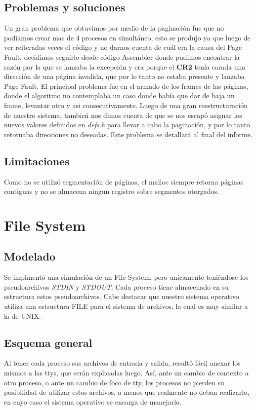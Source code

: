 \documentclass[10pt,a4paper]{article}
\begin{document}
	\subsection{Problemas y soluciones}
		Un gran problema que obtuvimos por medio de la paginaci\'on fue que no podiamos crear mas de 4 procesos en simult\'aneo, esto se produjo ya que luego de ver reiteradas veces el c\'odigo y no darnos cuenta de cu\'al era la causa del Page Fault, decidimos seguirlo desde c\'odigo Assembler donde pudimos encontrar la raz\'on por la que se lanzaba la excepci\'on y era porque el \textbf{CR2} ten\'ia carada una direcci\'on de una p\'agina invalida, que por lo tanto no estaba presente y lanzaba Page Fault. El principal problema fue en el armado de los frames de las p\'aginas, donde el algoritmo no contemplaba un caso donde hab\'ia que dar de baja un frame, levantar otro y asi consecutivamente. Luego de una gran reestructuraci\'on de nuestro sistema, tambie\'n nos dimos cuenta de que se nos escap\'o asignar los nuevos valores definidos en \textit{defs.h} para llevar a cabo la paginaci\'on, y por lo tanto retornaba direcciones no deseadas. Este problema se detallar\'a al final del informe.
	\subsection{Limitaciones}
		Como no se utiliz\'o segmentaci\'on de p\'aginas, el malloc siempre retorna p\'aginas contiguas y no se almacena ningun registro sobre segmentos otorgados.

\section{File System} 
	\subsection{Modelado}
		Se implment\'o una simulaci\'on de un File System, pero unicamente teni\'endose los pseudoarchivos \textit{STDIN} y \textit{STDOUT}. Cada proceso tiene almacenado en su estructura estos pseudoarchivos. Cabe destacar que nuestro sistema operativo utiliza una estructura FILE para el sistema de archivos, la cual es muy similar a la de UNIX.
	\subsection{Esquema general}
		Al tener cada proceso sus archivos de entrada y salida, result\'o f\'acil anexar los mismos a las ttys, que ser\'an explicadas luego. As\'i, ante un cambio de contexto a otro proceso, o ante un cambio de foco de tty, los procesos no pierden su posibilidad de utilizar estos archivos, a menos que realmente no deban realizarlo, en cuyo caso el sistema operativo se encarga de manejarlo.	
\end{document}
